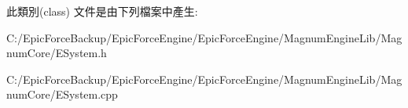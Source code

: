 此類別(class) 文件是由下列檔案中產生\+:\begin{DoxyCompactItemize}
\item 
C\+:/\+Epic\+Force\+Backup/\+Epic\+Force\+Engine/\+Epic\+Force\+Engine/\+Magnum\+Engine\+Lib/\+Magnum\+Core/E\+System.\+h\item 
C\+:/\+Epic\+Force\+Backup/\+Epic\+Force\+Engine/\+Epic\+Force\+Engine/\+Magnum\+Engine\+Lib/\+Magnum\+Core/E\+System.\+cpp\end{DoxyCompactItemize}

